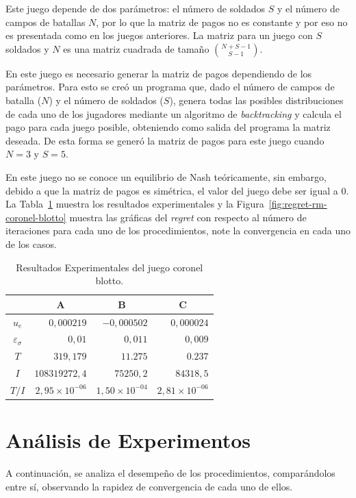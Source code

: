 Este juego depende de dos parámetros: el número de soldados $S$ y el número de campos de batallas $N$, por lo que la matriz de pagos no es constante y por eso no es presentada como en los juegos anteriores. La matriz para un juego con $S$ soldados y $N$ es una matriz cuadrada de tamaño $\binom{N+S-1}{S-1}$.

En este juego es necesario generar la matriz de pagos dependiendo de los parámetros. Para esto se creó un programa que, dado el número de campos de batalla ($N$) y el número de soldados ($S$), genera todas las posibles distribuciones de cada uno de los jugadores mediante un algoritmo de \textit{backtracking} y calcula el pago para cada juego posible, obteniendo como salida del programa la matriz deseada. De esta forma se generó la matriz de pagos para este juego cuando $N = 3$ y $S = 5$.

En este juego no se conoce un equilibrio de Nash teóricamente, sin embargo, debido a que la matriz de pagos es simétrica, el valor del juego debe ser igual a $0$. La Tabla~\ref{table:resultados-rm-blotto} muestra los resultados experimentales y la Figura~\ref{fig:regret-rm-coronel-blotto} muestra las gráficas del \textit{regret} con respecto al número de iteraciones para cada uno de los procedimientos, note la convergencia en cada uno de los casos.

\begin{table}[h]
\caption{Resultados Experimentales del juego coronel blotto.}
\label{table:resultados-rm-blotto}
\centering
\begin{tabular}{c r r r}
    \toprule
    & \multicolumn{1}{c}{A} & \multicolumn{1}{c}{B} & \multicolumn{1}{c}{C} \\ \midrule
    $u_e$ & $0,000219$ & $-0,000502$ & $0,000024$ \\
    $\varepsilon_{\sigma}$ & $0,01$ & $0,011$ & $0,009$  \\
    $T$ &  $319,179$ &  $11.275$ & $0.237$\\
    $I$ &  $108319272,4$ & $75250,2$  & $84318,5$ \\
    $T/I$ & $2,95 {\times} 10^{-06}$ & $1,50 {\times} 10^{-04}$ & $2,81 {\times} 10^{-06}$\\
    \bottomrule
\end{tabular}
\end{table}

 
\section{Análisis de Experimentos}
A continuación, se analiza el desempeño de los procedimientos, comparándolos entre sí, observando la rapidez de convergencia de cada uno de ellos.


